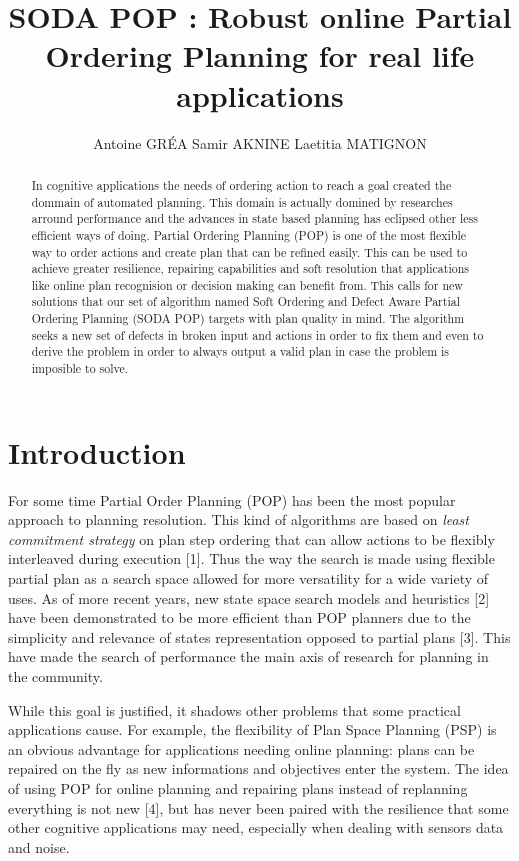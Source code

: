 \documentclass[]{article}
\title{SODA POP : Robust online Partial Ordering Planning for real life
applications}
\author{Antoine GRÉA Samir AKNINE Laetitia MATIGNON}
\date{}
\begin{document}
\maketitle
\begin{abstract}
In cognitive applications the needs of ordering action to reach a goal
created the dommain of automated planning. This domain is actually
domined by researches arround performance and the advances in state
based planning has eclipsed other less efficient ways of doing. Partial
Ordering Planning (POP) is one of the most flexible way to order actions
and create plan that can be refined easily. This can be used to achieve
greater resilience, repairing capabilities and soft resolution that
applications like online plan recognision or decision making can benefit
from. This calls for new solutions that our set of algorithm named Soft
Ordering and Defect Aware Partial Ordering Planning (SODA POP) targets
with plan quality in mind. The algorithm seeks a new set of defects in
broken input and actions in order to fix them and even to derive the
problem in order to always output a valid plan in case the problem is
imposible to solve.
\end{abstract}

\section*{Introduction}\label{introduction}

For some time Partial Order Planning (POP) has been the most popular
approach to planning resolution. This kind of algorithms are based on
\emph{least commitment strategy} on plan step ordering that can allow
actions to be flexibly interleaved during execution {[}1{]}. Thus the
way the search is made using flexible partial plan as a search space
allowed for more versatility for a wide variety of uses. As of more
recent years, new state space search models and heuristics {[}2{]} have
been demonstrated to be more efficient than POP planners due to the
simplicity and relevance of states representation opposed to partial
plans {[}3{]}. This have made the search of performance the main axis of
research for planning in the community.

While this goal is justified, it shadows other problems that some
practical applications cause. For example, the flexibility of Plan Space
Planning (PSP) is an obvious advantage for applications needing online
planning: plans can be repaired on the fly as new informations and
objectives enter the system. The idea of using POP for online planning
and repairing plans instead of replanning everything is not new {[}4{]},
but has never been paired with the resilience that some other cognitive
applications may need, especially when dealing with sensors data and
noise.
\end{document}
